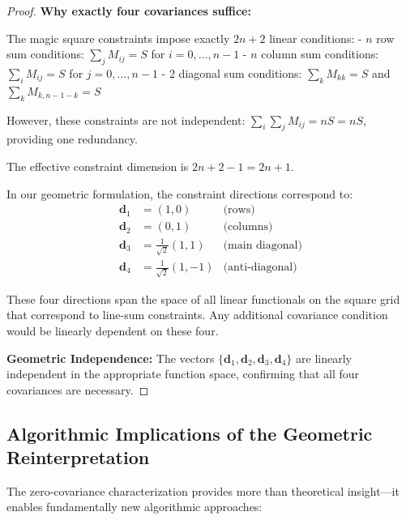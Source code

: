\begin{proof}
\textbf{Why exactly four covariances suffice:}

The magic square constraints impose exactly $2n + 2$ linear conditions:
- $n$ row sum conditions: $\sum_j M_{ij} = S$ for $i = 0,\ldots,n-1$
- $n$ column sum conditions: $\sum_i M_{ij} = S$ for $j = 0,\ldots,n-1$  
- 2 diagonal sum conditions: $\sum_k M_{kk} = S$ and $\sum_k M_{k,n-1-k} = S$

However, these constraints are not independent: $\sum_i \sum_j M_{ij} = nS = nS$, providing one redundancy.

The effective constraint dimension is $2n + 2 - 1 = 2n + 1$.

In our geometric formulation, the constraint directions correspond to:
\begin{align}
\mathbf{d}_1 &= (1, 0) & \text{(rows)}\\
\mathbf{d}_2 &= (0, 1) & \text{(columns)}\\
\mathbf{d}_3 &= \frac{1}{\sqrt{2}}(1, 1) & \text{(main diagonal)}\\
\mathbf{d}_4 &= \frac{1}{\sqrt{2}}(1, -1) & \text{(anti-diagonal)}
\end{align}

These four directions span the space of all linear functionals on the square grid that correspond to line-sum constraints. Any additional covariance condition would be linearly dependent on these four.

\textbf{Geometric Independence:} The vectors $\{\mathbf{d}_1, \mathbf{d}_2, \mathbf{d}_3, \mathbf{d}_4\}$ are linearly independent in the appropriate function space, confirming that all four covariances are necessary.
\end{proof}

\subsection{Algorithmic Implications of the Geometric Reinterpretation}

The zero-covariance characterization provides more than theoretical insight—it enables fundamentally new algorithmic approaches:

